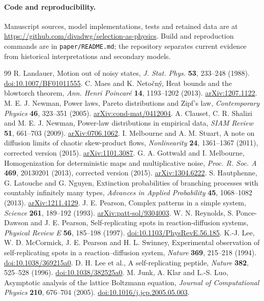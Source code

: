 \documentclass[11pt,a4paper]{article}
\begin{document}
\paragraph{Code and reproducibility.}
Manuscript sources, model implementations, tests and retained data are at
\url{https://github.com/divadwg/selection-as-physics}.
Build and reproduction commands are in \texttt{paper/README.md}; the repository
separates current evidence from historical interpretations and secondary models.

\begin{thebibliography}{99}
 R. Landauer, Motion out of noisy states,
\emph{J. Stat. Phys.} \textbf{53}, 233--248 (1988).
\href{https://doi.org/10.1007/BF01011555}{doi:10.1007/BF01011555}.
 C. Maes and K. Neto\v{c}n\'y, Heat bounds and the blowtorch theorem,
\emph{Ann. Henri Poincar\'e} \textbf{14}, 1193--1202 (2013).
\href{https://arxiv.org/abs/1207.1122}{arXiv:1207.1122}.
 M. E. J. Newman, Power laws, Pareto distributions and Zipf's law,
\emph{Contemporary Physics} \textbf{46}, 323--351 (2005).
\href{https://arxiv.org/abs/cond-mat/0412004}{arXiv:cond-mat/0412004}.
 A. Clauset, C. R. Shalizi and M. E. J. Newman,
Power-law distributions in empirical data,
\emph{SIAM Review} \textbf{51}, 661--703 (2009).
\href{https://arxiv.org/abs/0706.1062}{arXiv:0706.1062}.
 I. Melbourne and A. M. Stuart,
A note on diffusion limits of chaotic skew-product flows,
\emph{Nonlinearity} \textbf{24}, 1361--1367 (2011), corrected version (2015).
\href{https://arxiv.org/abs/1101.3087}{arXiv:1101.3087}.
 G. A. Gottwald and I. Melbourne,
Homogenization for deterministic maps and multiplicative noise,
\emph{Proc. R. Soc. A} \textbf{469}, 20130201 (2013), corrected version (2015).
\href{https://arxiv.org/abs/1304.6222}{arXiv:1304.6222}.
 S. Hautphenne, G. Latouche and G. Nguyen,
Extinction probabilities of branching processes with countably infinitely many types,
\emph{Advances in Applied Probability} \textbf{45}, 1068--1082 (2013).
\href{https://arxiv.org/abs/1211.4129}{arXiv:1211.4129}.
 J. E. Pearson, Complex patterns in a simple system,
\emph{Science} \textbf{261}, 189--192 (1993).
\href{https://arxiv.org/abs/patt-sol/9304003}{arXiv:patt-sol/9304003}.
 W. N. Reynolds, S. Ponce-Dawson and J. E. Pearson,
Self-replicating spots in reaction-diffusion systems,
\emph{Physical Review E} \textbf{56}, 185--198 (1997).
\href{https://doi.org/10.1103/PhysRevE.56.185}{doi:10.1103/PhysRevE.56.185}.
 K.-J. Lee, W. D. McCormick, J. E. Pearson and H. L. Swinney,
Experimental observation of self-replicating spots in a reaction--diffusion system,
\emph{Nature} \textbf{369}, 215--218 (1994).
\href{https://doi.org/10.1038/369215a0}{doi:10.1038/369215a0}.
 D. H. Lee et al., A self-replicating peptide,
\emph{Nature} \textbf{382}, 525--528 (1996).
\href{https://doi.org/10.1038/382525a0}{doi:10.1038/382525a0}.
 M. Junk, A. Klar and L.-S. Luo, Asymptotic analysis of the lattice Boltzmann equation,
\emph{Journal of Computational Physics} \textbf{210}, 676--704 (2005).
\href{https://doi.org/10.1016/j.jcp.2005.05.003}{doi:10.1016/j.jcp.2005.05.003}.
\end{thebibliography}
\end{document}
